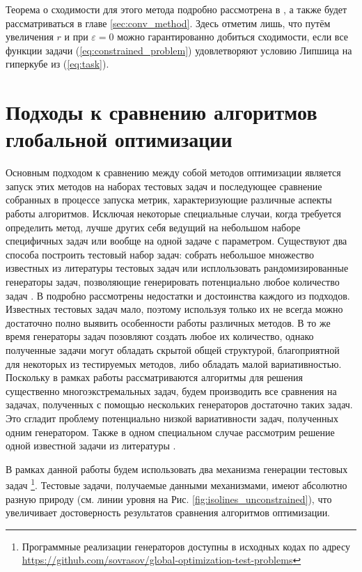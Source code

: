 Теорема о сходимости для этого метода подробно рассмотрена в \cite{Strongin2000}, а также будет рассматриваться в главе \ref{sec:conv_method}.
Здесь отметим лишь, что путём увеличения \(r\) и при \(\varepsilon=0\) можно гарантированно добиться сходимости,
если все функции задачи (\ref{eq:constrained_problem}) удовлетворяют условию Липшица на гиперкубе из (\ref{eq:task}).

\section{Подходы к сравнению алгоритмов глобальной оптимизации}
\label{sec:comp_tools}
Основным подходом к сравнению между собой методов оптимизации является запуск этих методов на наборах тестовых задач
и последующее сравнение собранных в процессе запуска метрик, характеризующие различные аспекты работы алгоритмов.
Исключая некоторые специальные случаи, когда требуется определить метод, лучше других себя ведущий на небольшом наборе специфичных задач
или вообще на одной задаче с параметром. Существуют два способа построить тестовый набор задач: собрать небольшое множество
известных из литературы тестовых задач \cite{kampfComparison2010} или исплользовать рандомизированные генераторы задач, позволяющие генерировать потенциально
любое количество задач \cite{Gaviano2003, grishaginClass}. В \cite{Beiranvand2017} подробно рассмотрены недостатки и достоинства каждого из
подходов. Известных тестовых задач мало, поэтому используя только их не всегда можно достаточно полно выявить особенности работы различных методов.
В то же время генераторы задач позовляют создать любое их количество, однако полученные задачи могут обладать скрытой общей структурой, благоприятной для
некоторых из тестируемых методов, либо обладать малой вариативностью. Поскольку в рамках работы рассматриваются алгоритмы
для решения существенно многоэкстремальных задач, будем производить все сравнения на задачах, полученных с помощью нескольких генераторов
достаточно таких задач. Это сгладит проблему потенциально низкой вариативности задач, полученных одним генератором. Также в одном специальном
случае рассмотрим решение одной известной задачи из литературы \cite{BinhKorn1999}.

В рамках данной работы будем использовать два механизма генерации тестовых задач \cite{grishaginClass, Gaviano2003} \footnote{Программные реализации
генераторов доступны в исходных кодах по адресу \url{https://github.com/sovrasov/global-optimization-test-problems}}. Тестовые задачи, получаемые
данными механизмами, имеют абсолютно разную природу (см. линии уровня на Рис. \ref{fig:isolines_unconstrained}),
что увеличивает достоверность результатов сравнения алгоритмов оптимизации.

